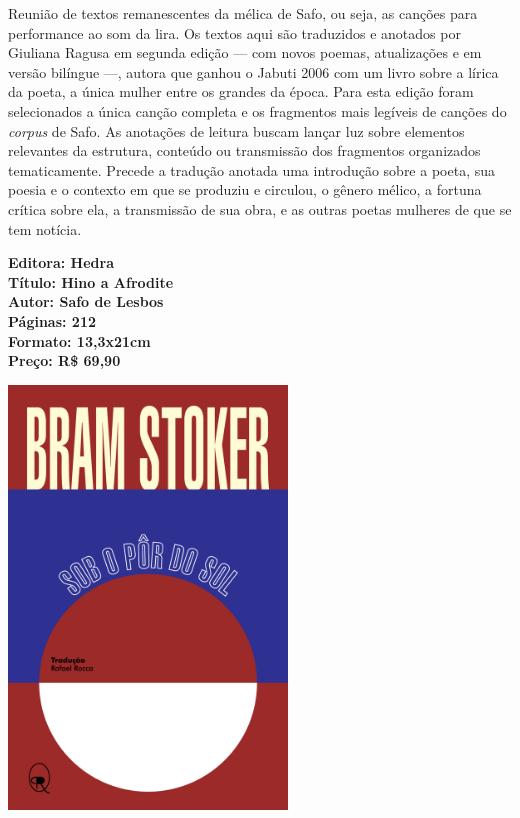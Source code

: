 \medskip

\noindent{}Reunião de textos remanescentes da mélica de Safo, ou seja, as canções para performance ao som da lira. Os textos aqui são traduzidos e anotados por Giuliana Ragusa em segunda edição — com novos poemas, atualizações e em versão bilíngue —, autora que ganhou o Jabuti 2006 com um livro sobre a lírica da poeta, a única mulher entre os grandes da época. Para esta edição foram selecionados a única canção completa e os fragmentos mais legíveis de canções do \textit{corpus} de Safo. As anotações de leitura buscam lançar luz sobre elementos relevantes da estrutura, conteúdo ou transmissão dos fragmentos organizados tematicamente. Precede a tradução anotada uma introdução sobre a poeta, sua poesia e o contexto em que se produziu e circulou, o gênero mélico, a fortuna crítica sobre ela, a transmissão de sua obra, e as outras poetas mulheres de que se tem notícia.

\vfill

\noindent\begin{minipage}[c]{1\linewidth}
{\small\textbf{
\hspace*{-.1cm}Editora: Hedra\\
Título: Hino a Afrodite\\
Autor: Safo de Lesbos\\ 
Páginas: 212\\
Formato: 13,3x21cm\\
Preço: R\$ 69,90\\
}}
\end{minipage}

\pagebreak


\begin{center}
\hspace*{-3.6cm}
\hspace*{3.1cm}\includegraphics[width=74mm]{./grid/stoker.png}
\end{center}

